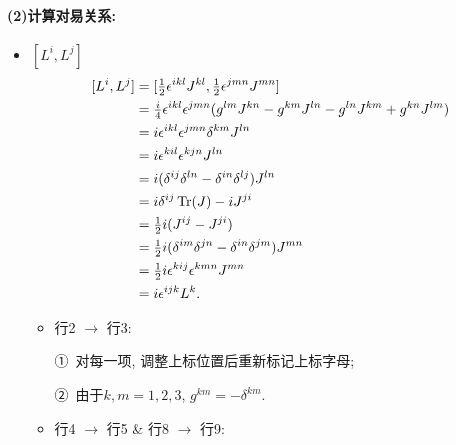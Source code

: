 \paragraph*{(2)计算对易关系: }
\begin{itemize}
  \item $[L^i, L^j]$
        \begin{equation}
          \begin{aligned}
            \relax[L^i, L^j] & = [\tfrac{1}{2}\epsilon^{ikl}J^{kl}, \tfrac{1}{2}\epsilon^{jmn}J^{mn}]                                \\
                             & = \tfrac{i}{4}\epsilon^{ikl}\epsilon^{jmn}(g^{lm}J^{kn} - g^{km}J^{ln} - g^{ln}J^{km} + g^{kn}J^{lm}) \\
                             & = i\epsilon^{ikl}\epsilon^{jmn}\delta^{km}J^{ln}                                                      \\
                             & = i\epsilon^{kil}\epsilon^{kjn}J^{ln}                                                                 \\
                             & = i(\delta^{ij}\delta^{ln}-\delta^{in}\delta^{lj})J^{ln}                                              \\
                             & = i\delta^{ij}\operatorname{Tr}(J) - iJ^{ji}                                                                   \\
                             & = \tfrac{1}{2}i(J^{ij} - J^{ji})                                                                      \\
                             & = \tfrac{1}{2}i(\delta^{im}\delta^{jn}-\delta^{in}\delta^{jm})J^{mn}                                  \\
                             & = \tfrac{1}{2}i\epsilon^{kij}\epsilon^{kmn}J^{mn}                                                     \\
                             & = i\epsilon^{ijk}L^k.
          \end{aligned}
        \end{equation}
        \begin{itemize}
          \item 行2 $\rightarrow$ 行3:

                \quad ①\ 对每一项, 调整上标位置后重新标记上标字母;

                \quad ②\ 由于$k, m = 1, 2, 3$, $g^{km} = -\delta^{km}$.
          \item 行4 $\rightarrow$ 行5 \& 行8 $\rightarrow$ 行9:


\end{itemize}
\end{itemize}
